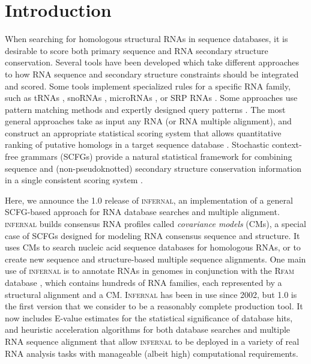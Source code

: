 \section{Introduction}

When searching for homologous structural RNAs in sequence databases, it is
desirable to score both primary sequence and RNA secondary structure
conservation. Several tools have been developed which take different
approaches to how RNA sequence and secondary structure constraints
should be integrated and scored. Some tools implement specialized
rules for a specific RNA family, such as tRNAs
\citep{LoweEddy97,Laslett04}, snoRNAs \citep{LoweEddy99,Schattner06},
microRNAs \citep{Lai03,Lim03}, or SRP RNAs \citep{Lai03,Lim03}. Some
approaches use pattern matching methods and expertly designed query
patterns \citep{Macke01}. The most general approaches take as input
any RNA (or RNA multiple alignment), and construct an appropriate
statistical scoring system that allows quantitative ranking of
putative homologs in a target sequence database
\citep{Gautheret01,ZhangBafna05}.  Stochastic context-free grammars
(SCFGs) provide a natural statistical framework for combining sequence
and (non-pseudoknotted) secondary structure conservation information
in a single consistent scoring system
\citep{Sakakibara94c,Eddy94,Brown00,Durbin98}.

Here, we announce the 1.0 release of \textsc{infernal}, an
implementation of a general SCFG-based approach for RNA database
searches and multiple alignment. \textsc{infernal} builds consensus
RNA profiles called \emph{covariance models} (CMs), a special case of
SCFGs designed for modeling RNA consensus sequence and structure. It
uses CMs to search nucleic acid sequence databases for homologous
RNAs, or to create new sequence and structure-based multiple sequence
alignments. One main use of \textsc{infernal} is to annotate RNAs in
genomes in conjunction with the \textsc{Rfam} database
\citep{Griffiths-Jones05}, which contains hundreds of RNA families,
each represented by a structural alignment and a CM. \textsc{Infernal}
has been in use since 2002, but 1.0 is the first version that we
consider to be a reasonably complete production tool. It now includes
E-value estimates for the statistical significance of database hits,
and heuristic acceleration algorithms for both database searches and
multiple RNA sequence alignment that allow \textsc{infernal} to be
deployed in a variety of real RNA analysis tasks with manageable
(albeit high) computational requirements.

